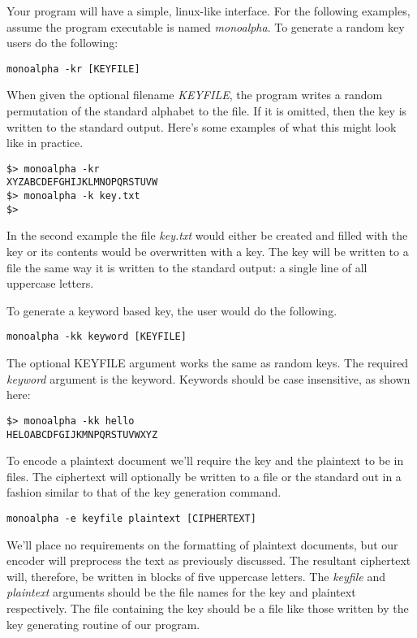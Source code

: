 \documentclass[]{tufte-handout}
\begin{document}
Your program will have a simple, linux-like interface. For the following examples, assume the program executable is named \textit{monoalpha}. To generate a random key users do the following:
\begin{verbatim}
monoalpha -kr [KEYFILE]
\end{verbatim}  
When given the optional filename \textit{KEYFILE}, the program writes a random permutation of the standard alphabet to the file. If it is omitted, then the key is written to the standard output. Here's some examples of what this might look like in practice.
\begin{verbatim}
$> monoalpha -kr
XYZABCDEFGHIJKLMNOPQRSTUVW
$> monoalpha -k key.txt
$>
\end{verbatim}
In the second example the file \textit{key.txt} would either be created and filled with the key or its contents would be overwritten with a key. The key will be written to a file the same way it is written to the standard output: a single line of all uppercase letters.

To generate a keyword based key, the user would do the following.
\begin{verbatim}
monoalpha -kk keyword [KEYFILE]
\end{verbatim}
The optional KEYFILE argument works the same as random keys. The required \textit{keyword} argument is the keyword. Keywords should be case insensitive, as shown here:
\begin{verbatim}
$> monoalpha -kk hello
HELOABCDFGIJKMNPQRSTUVWXYZ
\end{verbatim}

To encode a plaintext document we'll require the key and the plaintext to be in files.  The ciphertext will optionally be written to a file or the standard out in a fashion similar to that of the key generation command.
\begin{verbatim}
monoalpha -e keyfile plaintext [CIPHERTEXT]
\end{verbatim}
We'll place no requirements on the formatting of plaintext documents, but our encoder will preprocess the text as previously discussed. The resultant ciphertext will, therefore, be written in blocks of five uppercase letters. The \textit{keyfile} and \textit{plaintext} arguments should be the file names for the key and plaintext respectively. The file containing the key should be a file like those written by the key generating routine of our program.
\end{document}
